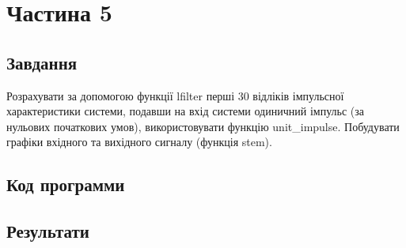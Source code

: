 \section{Частина 5}
\label{sec:task5}

\subsection{Завдання}
\label{subsec:task5_task}

Розрахувати за допомогою функції lfilter перші 30 відліків
імпульсної характеристики системи, подавши на вхід системи одиничний
імпульс (за нульових початкових умов), використовувати функцію
unit_impulse. Побудувати графіки вхідного та вихідного сигналу (функція
stem).

\subsection{Код программи}
\label{subsec:task5_code}

\subsection{Результати}
\label{subsec:task5_results}
